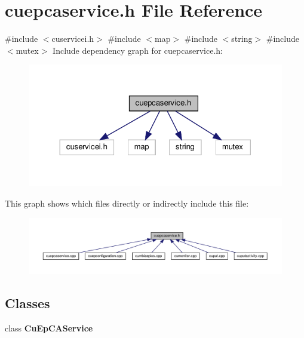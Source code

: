 \section{cuepcaservice.\+h File Reference}
\label{cuepcaservice_8h}
{\ttfamily \#include $<$cuservicei.\+h$>$}\newline
{\ttfamily \#include $<$map$>$}\newline
{\ttfamily \#include $<$string$>$}\newline
{\ttfamily \#include $<$mutex$>$}\newline
Include dependency graph for cuepcaservice.\+h\+:\nopagebreak
\begin{figure}[H]
\begin{center}
\leavevmode
\includegraphics[width=324pt]{cuepcaservice_8h__incl}
\end{center}
\end{figure}
This graph shows which files directly or indirectly include this file\+:\nopagebreak
\begin{figure}[H]
\begin{center}
\leavevmode
\includegraphics[width=350pt]{cuepcaservice_8h__dep__incl}
\end{center}
\end{figure}
\subsection*{Classes}
\begin{DoxyCompactItemize}
\item 
class \textbf{ Cu\+Ep\+C\+A\+Service}
\end{DoxyCompactItemize}
